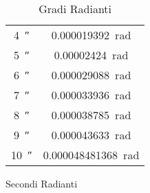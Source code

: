 \begin{table}
\begin{subtable}[b]{.3\linewidth}
\begin{tabular}{cc}
	\SI{4}{\arcsecond}&\SI[round-precision=\extralungarrotandamento,round-mode=places]{0.000019392}{\radian}  \\ 
	\SI{5}{\arcsecond}&\SI[round-precision=\extralungarrotandamento,round-mode=places]{0.00002424}{\radian}  \\ 
	\SI{6}{\arcsecond}&\SI[round-precision=\extralungarrotandamento,round-mode=places]{0.000029088}{\radian}  \\ 
	\SI{7}{\arcsecond}&\SI[round-precision=\extralungarrotandamento,round-mode=places]{0.000033936}{\radian}  \\ 
	\SI{8}{\arcsecond}&\SI[round-precision=\extralungarrotandamento,round-mode=places]{0.000038785}{\radian}  \\ 
	\SI{9}{\arcsecond}&\SI[round-precision=\extralungarrotandamento,round-mode=places]{0.000043633}{\radian}  \\  
	\SI{10}{\arcsecond}&\SI[round-precision=\extralungarrotandamento,round-mode=places]{0.000048481368}{\radian}  \\  
	\bottomrule
\end{tabular}
	\caption{Secondi Radianti}
\end{subtable}
	\caption{Gradi Radianti}
\end{table}

